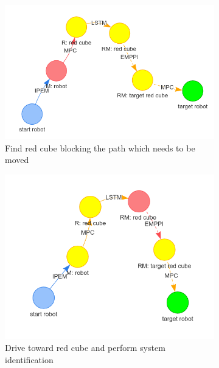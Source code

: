 \begin{figure}[H]
     \begin{subfigure}[b]{0.49\textwidth}
         \centering
         \includegraphics[width=\textwidth]{figures/surrounded/3.png}
         \caption{Find red cube blocking the path which needs to be moved}
     \end{subfigure}
     \hfill
     \begin{subfigure}[b]{0.49\textwidth}
         \centering
         \includegraphics[width=\textwidth]{figures/surrounded/4.png}
         \caption{Drive toward red cube and perform system identification}
     \end{subfigure}
     \begin{subfigure}[b]{0.49\textwidth}
         \centering

\end{subfigure}
\end{figure}

